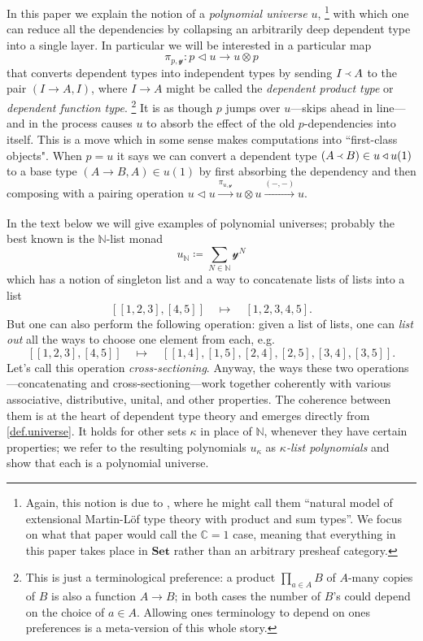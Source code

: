 \documentclass[11pt, one side, article]{memoir}
\theoremstyle{definition}
\theoremstyle{plain}
\newcommand{\Cat}[1]{\mathbf{#1}}%
\newcommand{\To}[2][]{\xrightarrow[#1]{#2}}
\newcommand{\nn}{\mathbb{N}}
\newcommand{\smset}{\Cat{Set}}
\newcommand{\yon}{\mathcal{y}}
\newcommand{\0}{\textsf{0}}
\newcommand{\1}{\tn{\textsf{1}}}
\newcommand{\tri}{\mathbin{\triangleleft}}
\newcommand{\jump}{\pi}
\newcommand{\founds}{\Yleft}
\begin{document}
In this paper we explain the notion of a \emph{polynomial universe} $u$,%
\footnote{Again, this notion is due to \cite[Theorem 16]{awodey2014natural}, where he might call them ``natural model of extensional Martin-L\"{o}f type theory with
product and sum types''. We focus on what that paper would call the $\mathbb{C}=1$ case, meaning that everything in this paper takes place in $\smset$ rather than an arbitrary presheaf category.}
with which one can reduce all the dependencies by collapsing an arbitrarily deep dependent type into a single layer. In particular we will be interested in a particular map
\begin{equation}\label{eqn.jump}
  \jump_{p,\yon}\colon p\tri u\to u\otimes p
\end{equation}
that converts dependent types into independent types by sending $I\founds A$ to the pair $(I\to A,I)$, where $I\to A$ might be called the \emph{dependent product type} or \emph{dependent function type}.%
\footnote{This is just a terminological preference: a product $\prod_{a\in A}B$ of $A$-many copies of $B$ is also a function $A\to B$; in both cases the number of $B$'s could depend on the choice of $a\in A$. Allowing ones terminology to depend on ones preferences is a meta-version of this whole story.}
It is as though $p$ jumps over $u$---skips ahead in line---and in the process causes $u$ to absorb the effect of the old $p$-dependencies into itself. This is a move which in some sense makes computations into ``first-class objects". When $p=u$ it says we can convert a dependent type $(A\founds B)\in u\tri u(1)$ to a base type $(A\to B,A)\in u(1)$ by first absorbing the dependency and then composing with a pairing operation $u\tri u\To{\jump_{u,\yon}} u\otimes u\To{(-,-)} u$.

In the text below we will give examples of polynomial universes; probably the best known is the $\nn$-list monad
\[
	u_\nn\coloneqq\sum_{N\in\nn}\yon^N
\]
which has a notion of singleton list and a way to concatenate lists of lists into a list
\[[[1,2,3],[4,5]]\quad\mapsto\quad [1,2,3,4,5].\]
But one can also perform the following operation: given a list of lists, one can \emph{list out} all the ways to choose one element from each, e.g.
\[
[[1,2,3],[4,5]]\quad\mapsto\quad [[1,4],[1,5],[2,4],[2,5],[3,4],[3,5]].
\]
Let's call this operation \emph{cross-sectioning}. Anyway, the ways these two operations---concatenating and cross-sectioning---work together coherently with various associative, distributive, unital, and other properties. The coherence between them is at the heart of dependent type theory and emerges directly from \cref{def.universe}. It holds for other sets $\kappa$ in place of $\nn$, whenever they have certain properties; we refer to the resulting polynomials $u_\kappa$ as \emph{$\kappa$-list polynomials} and show that each is a polynomial universe.
\end{document}
